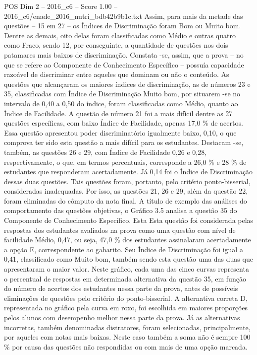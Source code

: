 \begin{textsample}{POS Dim 2 – 2016\_c6 – Score 1.00 – 2016\_c6/enade\_2016\_nutri\_bdb42b9b1c.txt}
Assim, para mais da metade das questões – 15 em 27 – os Índices de Discriminação foram Bom ou Muito bom.
Dentre as demais, oito delas foram classificadas como Médio e outras quatro como Fraco, sendo 12, por conseguinte, a quantidade de questões nos dois patamares mais baixos de discriminação.
Constata -se, assim, que a prova – no que se refere ao Componente de Conhecimento Específico – possuía capacidade razoável de discriminar entre aqueles que dominam ou não o conteúdo.
As questões que alcançaram os maiores índices de discriminação, as de números 23 e 35, classificadas com Índice de Discriminação Muito bom, por situarem -se no intervalo de 0,40 a 0,50 do índice, foram classificadas como Médio, quanto ao Índice de Facilidade.
A questão de número 21 foi a mais difícil dentre as 27 questões específicas, com baixo Índice de Facilidade, apenas 17,0 \% de acertos.
Essa questão apresentou poder discriminatório igualmente baixo, 0,10, o que comprova ter sido esta questão a mais difícil para os estudantes.
Destacam -se, também, as questões 26 e 29, com Índice de Facilidade 0,26 e 0,28, respectivamente, o que, em termos percentuais, corresponde a 26,0 \% e 28 \% de estudantes que responderam acertadamente.
Já 0,14 foi o Índice de Discriminação dessas duas questões.
Tais questões foram, portanto, pelo critério ponto-bisserial, consideradas inadequadas.
Por isso, as questões 21, 26 e 29, além da questão 22, foram eliminadas do cômputo da nota final.
A título de exemplo das análises do comportamento das questões objetivas, o Gráfico 3.5 analisa a questão 35 do Componente de Conhecimento Específico.
Esta Esta questão foi considerada pelas respostas dos estudantes avaliados na prova como uma questão com nível de facilidade Médio, 0,47, ou seja, 47,0 \% dos estudantes assinalaram acertadamente a opção E, correspondente ao gabarito.
Seu Índice de Discriminação foi igual a 0,41, classificado como Muito bom, também sendo esta questão uma das duas que apresentaram o maior valor.
Neste gráfico, cada uma das cinco curvas representa o percentual de respostas em determinada alternativa da questão 35, em função do número de acertos dos estudantes nessa parte da prova, antes de possíveis eliminações de questões pelo critério do ponto-bisserial.
A alternativa correta D, representada no gráfico pela curva em roxo, foi escolhida em maiores proporções pelos alunos com desempenho melhor nessa parte da prova.
Já as alternativas incorretas, também denominadas distratores, foram selecionadas, principalmente, por aqueles com notas mais baixas.
Neste caso também a soma não é sempre 100 \% por causa das questões não respondidas ou com mais de uma opção marcada.

\end{textsample}
